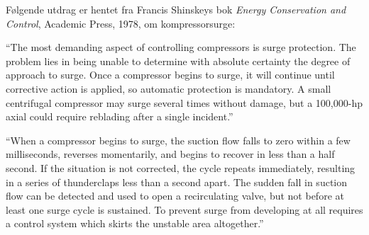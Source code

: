 Følgende utdrag er hentet fra Francis Shinskeys bok {\it Energy Conservation and Control}, Academic Press, 1978, om kompressorsurge:

\vskip 10pt {\narrower \noindent \baselineskip5pt

``The most demanding aspect of controlling compressors is surge protection.  The problem lies in being unable to determine with absolute certainty the degree of approach to surge.  Once a compressor begins to surge, it will continue until corrective action is applied, so automatic protection is mandatory.  A small centrifugal compressor may surge several times without damage, but a 100,000-hp axial could require reblading after a single incident.''

\vskip 5pt

``When a compressor begins to surge, the suction flow falls to zero within a few milliseconds, reverses momentarily, and begins to recover in less than a half second.  If the situation is not corrected, the cycle repeats immediately, resulting in a series of thunderclaps less than a second apart.  The sudden fall in suction flow can be detected and used to open a recirculating valve, but not before at least one surge cycle is sustained.  To prevent surge from developing at all requires a control system which skirts the unstable area altogether.''

\par} \vskip 10pt










